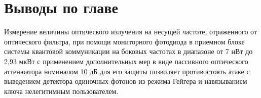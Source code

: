 \section{Выводы по главе} \label{ch:ch3/sect7}


Измерение величины оптического излучения на несущей частоте, отраженного от оптического фильтра, при помощи мониторного фотодиода в приемном блоке системы квантовой коммуникации на боковых частотах в диапазоне от 7 нВт до 2,93 мкВт с применением дополнительных мер в виде пассивного оптического аттенюатора номиналом 10 дБ для его защиты позволяет противостоять атаке с выведением детектора одиночных фотонов из режима Гейгера и навязыванием ключа нелегитимным пользователем. 
  